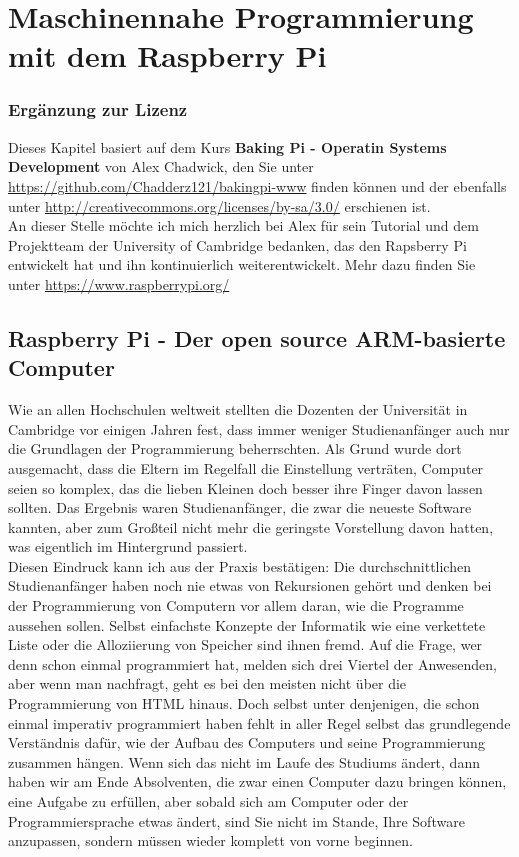 \chapter[Maschinennahe Programmierung mit RasPi]{Maschinennahe Programmierung mit dem Raspberry Pi}

\subsection*{Ergänzung zur Lizenz}

Dieses Kapitel basiert auf dem Kurs \textbf{Baking Pi - Operatin Systems Development} von Alex Chadwick, den Sie unter \url{https://github.com/Chadderz121/bakingpi-www} finden können und der ebenfalls unter \url{http://creativecommons.org/licenses/by-sa/3.0/} erschienen ist.\\

An dieser Stelle möchte ich mich herzlich bei Alex für sein Tutorial und dem Projektteam der University of Cambridge bedanken, das den Rapsberry Pi entwickelt hat und ihn kontinuierlich weiterentwickelt. Mehr dazu finden Sie unter \url{https://www.raspberrypi.org/}

\section{Raspberry Pi - Der open source ARM-basierte Computer}

Wie an allen Hochschulen weltweit stellten die Dozenten der Universität in Cambridge vor einigen Jahren fest, dass immer weniger Studienanfänger auch nur die Grundlagen der Programmierung beherrschten. Als Grund wurde dort ausgemacht, dass die Eltern im Regelfall die Einstellung verträten, Computer seien so komplex, das die lieben Kleinen doch besser ihre Finger davon lassen sollten. Das Ergebnis waren Studienanfänger, die zwar die neueste Software kannten, aber zum Großteil nicht mehr die geringste Vorstellung davon hatten, was eigentlich im Hintergrund passiert.\\

Diesen Eindruck kann ich aus der Praxis bestätigen: Die durchschnittlichen Studienanfänger haben noch nie etwas von Rekursionen gehört und denken bei der Programmierung von Computern vor allem daran, wie die Programme aussehen sollen. Selbst einfachste Konzepte der Informatik wie eine verkettete Liste oder die Alloziierung von Speicher sind ihnen fremd. Auf die Frage, wer denn schon einmal programmiert hat, melden sich drei Viertel der Anwesenden, aber wenn man nachfragt, geht es bei den meisten nicht über die Programmierung von HTML hinaus. Doch selbst unter denjenigen, die schon einmal imperativ programmiert haben fehlt in aller Regel selbst das grundlegende Verständnis dafür, wie der Aufbau des Computers und seine Programmierung zusammen hängen. Wenn sich das nicht im Laufe des Studiums ändert, dann haben wir am Ende Absolventen, die zwar einen Computer dazu bringen können, eine Aufgabe zu erfüllen, aber sobald sich am Computer oder der Programmiersprache etwas ändert, sind Sie nicht im Stande, Ihre Software anzupassen, sondern müssen wieder komplett von vorne beginnen.\\


